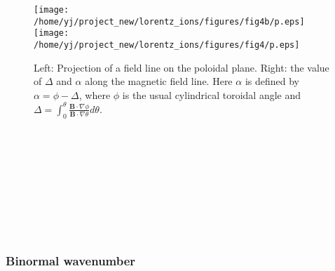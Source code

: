 \documentclass{llncs}
\begin{document}
\begin{figure}[h]
  \texttt{[image: /home/yj/project\_new/lorentz\_ions/figures/fig4b/p.eps]}\texttt{[image: /home/yj/project\_new/lorentz\_ions/figures/fig4/p.eps]}
  \caption{\label{17-10-2-p1}Left: Projection of a field line on the poloidal
  plane. Right: the value of $\Delta$ and $\alpha$ along the magnetic field
  line. Here $\alpha$ is defined by $\alpha = \phi - \Delta$, where $\phi$ is
  the usual cylindrical toroidal angle and $\Delta = \int_0^{\theta}
  \frac{\mathbf{B} \cdot \nabla \phi}{\mathbf{B} \cdot \nabla \theta} d
  \theta$.}
\end{figure}

\

\

\

\

\

\subsubsection{Binormal wavenumber}
\end{document}
